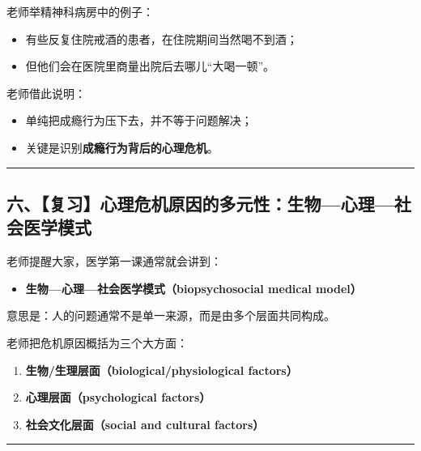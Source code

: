 \documentclass[
  chinese,
  9pt,
  a4paper,
]{ctexart}
\providecommand{\tightlist}{%
  \setlength{\itemsep}{0pt}\setlength{\parskip}{0pt}}
\begin{document}
老师举精神科病房中的例子：

\begin{itemize}
\tightlist
\item
  有些反复住院戒酒的患者，在住院期间当然喝不到酒；
\item
  但他们会在医院里商量出院后去哪儿``大喝一顿''。
\end{itemize}

老师借此说明：

\begin{itemize}
\tightlist
\item
  单纯把成瘾行为压下去，并不等于问题解决；
\item
  关键是识别\textbf{成瘾行为背后的心理危机}。
\end{itemize}

\begin{center}\rule{0.5\linewidth}{0.5pt}\end{center}

\subsection{六、【复习】心理危机原因的多元性：生物---心理---社会医学模式}\label{ux516dux590dux4e60ux5fc3ux7406ux5371ux673aux539fux56e0ux7684ux591aux5143ux6027ux751fux7269ux5fc3ux7406ux793eux4f1aux533bux5b66ux6a21ux5f0f}

老师提醒大家，医学第一课通常就会讲到：

\begin{itemize}
\tightlist
\item
  \textbf{生物---心理---社会医学模式（biopsychosocial medical model）}
\end{itemize}

意思是：人的问题通常不是单一来源，而是由多个层面共同构成。

老师把危机原因概括为三个大方面：

\begin{enumerate}
\def\labelenumi{\arabic{enumi}.}
\tightlist
\item
  \textbf{生物/生理层面（biological/physiological factors）}
\item
  \textbf{心理层面（psychological factors）}
\item
  \textbf{社会文化层面（social and cultural factors）}
\end{enumerate}

\begin{center}\rule{0.5\linewidth}{0.5pt}\end{center}
\end{document}
